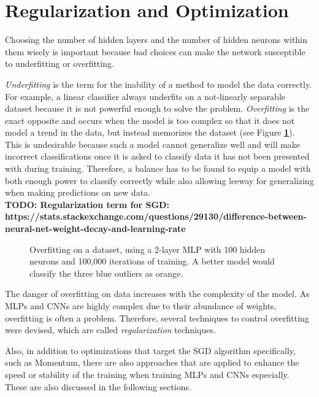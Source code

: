 	\section {Regularization and Optimization}
\label{sec:reg_opt}

Choosing the number of hidden layers and the number of hidden neurons within them wisely is important because bad choices can make the network susceptible to underfitting or overfitting.

\textit{Underfitting} is the term for the inability of a method to model the data correctly. For example, a linear classifier always underfits on a not-linearly separable dataset because it is not powerful enough to solve the problem. \textit{Overfitting} is the exact opposite and occurs when the model is too complex so that it does not model a trend in the data, but instead memorizes the dataset (see Figure \textbf{\ref{fig:overfit}}). This is undesirable because such a model cannot generalize well and will make incorrect classifications once it is asked to classify data it has not been presented with during training. Therefore, a balance has to be found to equip a model with both enough power to classify correctly while also allowing leeway for generalizing when making predictions on new data.\\

\textbf{TODO: Regularization term for SGD: https://stats.stackexchange.com/questions/29130/difference-between-neural-net-weight-decay-and-learning-rate}\\

	\begin {figure}[!ht]
		\begin{center}
			\scalebox{0.75}{}
		\end{center}
		\caption[Overfitting on a dataset.]{Overfitting on a dataset, using a 2-layer MLP with 100 hidden neurons and 100,000 iterations of training. A better model would classify the three blue outliers as orange.}
		\label{fig:overfit}
	\end {figure}

\noindent The danger of overfitting on data increases with the complexity of the model. As MLPs and CNNs are highly complex due to their abundance of weights, overfitting is often a problem. Therefore, several techniques to control overfitting were devised, which are called \textit{regularization} techniques.

Also, in addition to optimizations that target the SGD algorithm specifically, such as Momentum, there are also approaches that are applied to enhance the speed or stability of the training when training MLPs and CNNs especially. These are also discussed in the following sections.

